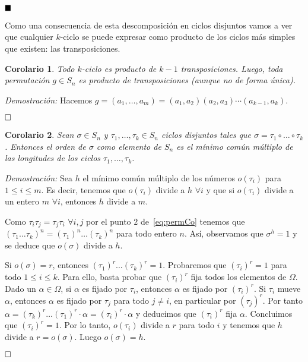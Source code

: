 \documentclass[12pt]{article}
\newtheorem{corolario}{Corolario}[theorem]
\begin{document}
$\hfill \blacksquare$

Como una consecuencia de esta descomposición en ciclos disjuntos vamos a ver que cualquier $k$-ciclo se puede expresar como producto de los ciclos más simples que existen: las transposiciones.

\begin{corolario} Todo $k$-ciclo es producto de $k-1$ transposiciones. Luego, toda permutación $g\in S_{n}$ es producto de transposiciones (aunque no de forma única).
\end{corolario}
\emph{Demostración: }
Hacemos $g = (a_{1}, \ldots, a_{m})=(a_{1},a_{2}) (a_{2},a_{3}) \cdots (a_{k-1},a_{k}).$

$\hfill \square$

\begin{corolario} 
Sean $\sigma \in S_{n}$ y $\tau_{1}, \ldots, \tau_{k} \in S_{n}$ ciclos disjuntos tales que $\sigma = \tau_{1} \circ \ldots \circ \tau_{k}$. Entonces el orden de $\sigma$ como elemento de $S_{n}$ es el mínimo común múltiplo de las longitudes de los ciclos $\tau_{1}, \ldots, \tau_{k}$.
\end{corolario} 
\emph{Demostración: }Sea $h$ el mínimo común múltiplo de los números $o(\tau_i)$ para $1 \leq i \leq m$. Es decir, tenemos que $o(\tau_i)$ divide a $h$ $\forall i$ y que si $o(\tau_i)$ divide a un entero $m$ $\forall i$, entonces $h$ divide a $m$.

Como $\tau_i\tau_j = \tau_j \tau_i$ $\forall i,j$ por el punto $2$ de~\ref{eq:permCo} tenemos que $(\tau_1 \ldots \tau_k)^n= (\tau_1)^n \ldots (\tau_k)^n$ para todo entero $n$. Así, observamos que $\sigma^h = 1$ y se deduce que $o(\sigma)$ divide a $h$.

Si $o(\sigma) = r$, entonces $(\tau_1)^r\ldots (\tau_k)^r = 1$. Probaremos que $(\tau_i)^r=1$ para todo $1 \leq i \leq k$. Para ello, basta probar que $(\tau_i)^r$ fija todos los elementos de $\Omega$. Dado un $\alpha \in \Omega$, si $\alpha$ es fijado por $\tau_i$, entonces $\alpha$ es fijado por $(\tau_i)^r$. Si $\tau_i$ mueve $\alpha$, entonces $\alpha$ es fijado por $\tau_j$ para todo $j \neq i$, en particular por $(\tau_j)^r$. Por tanto $\alpha = (\tau_k)^r \ldots (\tau_1)^r \cdot \alpha = (\tau_i)^r \cdot \alpha$ y deducimos que $(\tau_i)^r$ fija $\alpha$. Concluimos que $(\tau_i)^r = 1$. Por lo tanto, $o(\tau_i)$ divide a $r$ para todo $i$ y tenemos que $h$ divide a $r = o(\sigma).$ Luego $o(\sigma) = h$.


$\hfill \square$
\end{document}
